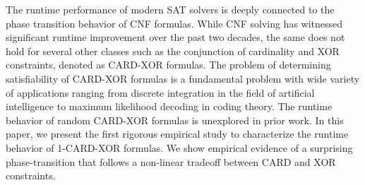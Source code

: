 The runtime performance of modern SAT solvers is deeply connected to the phase transition behavior of CNF formulas. While CNF solving has witnessed significant runtime improvement over the past two decades, the same does not hold for several other classes such as the conjunction of cardinality and XOR constraints, denoted as CARD-XOR formulas. The problem of determining satisfiability of CARD-XOR formulas is a fundamental problem with wide variety of applications ranging from discrete integration in the field of artificial intelligence to maximum likelihood decoding in coding theory. The runtime behavior of random CARD-XOR formulas is unexplored in prior work. In this paper, we present the first rigorous empirical study  to characterize the runtime behavior of 1-CARD-XOR formulas. We show empirical evidence of a surprising phase-transition that follows a non-linear tradeoff between CARD and XOR constraints.  